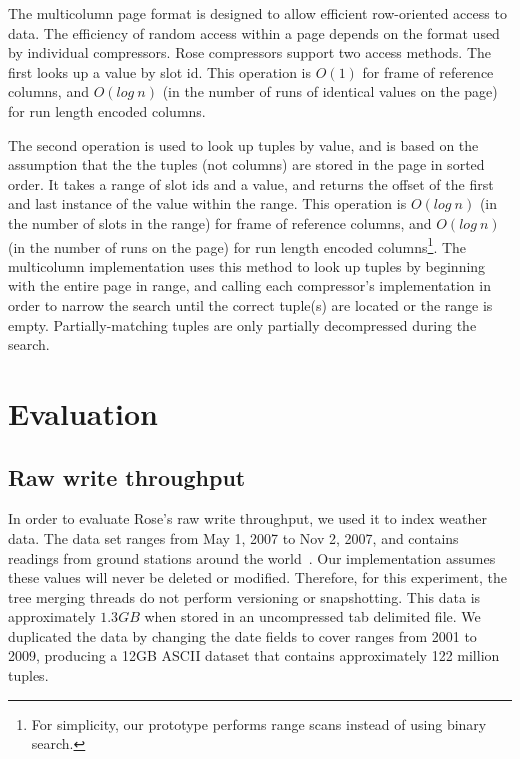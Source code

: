 \documentclass{vldb}
\newcommand{\rows}{Rose\xspace}
\newcommand{\rowss}{Rose's\xspace}
\begin{document}
The multicolumn page format is designed to allow efficient
row-oriented access to data.  The efficiency of random access within a
page depends on the format used by individual compressors.  \rows
compressors support two access methods.  The first looks up a value by
slot id.  This operation is $O(1)$ for frame of reference columns, and
$O(log~n)$ (in the number of runs of identical values on the page) for
run length encoded columns.

The second operation is used to look up tuples by value, and is based
on the assumption that the the tuples (not columns) are stored in the page in sorted
order.  It takes a range of slot ids and a value, and returns the
offset of the first and last instance of the value within the range.
This operation is $O(log~n)$ (in the number of slots in the range)
for frame of reference columns, and $O(log~n)$ (in the number of runs
on the page) for run length encoded columns\footnote{For simplicity,
our prototype performs range scans instead of using binary search.}.  The multicolumn
implementation uses this method to look up tuples by beginning with
the entire page in range, and calling each compressor's implementation
in order to narrow the search until the correct tuple(s) are located
or the range is empty.  Partially-matching tuples are only
partially decompressed during the search.


\section{Evaluation}

\subsection{Raw write throughput}

In order to evaluate \rowss raw write throughput, we used it to index
weather data.  The data set ranges from May 1,
2007 to Nov 2, 2007, and contains readings from ground stations around
the world~\cite{nssl}.  Our implementation assumes these values will never be deleted or modified.  Therefore, for this experiment, the tree merging threads do not perform versioning or snapshotting.  This data is approximately $1.3GB$ when stored in an
uncompressed tab delimited file.  We duplicated the data by changing
the date fields to cover ranges from 2001 to 2009, producing a 12GB
ASCII dataset that contains approximately 122 million tuples.
\end{document}
